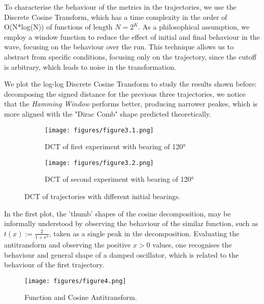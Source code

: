 \documentclass[11pt]{article}
\begin{document}
To characterise the behaviour of the metrics in the trajectories, we use the Discrete Cosine Transform, which has a time complexity in the order of O(N*log(N)) of functions of length $N = 2^K$. As a philosophical assumption, we employ a window function to reduce the effect of initial and final behaviour in the wave, focusing on the behaviour over the run. This technique allows us to abstract from specific conditions, focusing only on the trajectory, since the cutoff is arbitrary, which leads to noise in the transformation.

We plot the log-log Discrete Cosine Transform to study the results shown before: decomposing the signed distance for the previous three trajectories, we notice that the \textit{Hamming Window} performs better, producing narrower peakes, which is more aligned with the "Dirac Comb" shape predicted theoretically.

\begin{figure}[htbp]
  \centering
  \begin{subfigure}[b]{0.48\textwidth}
    \centering
    \texttt{[image: figures/figure3.1.png]}
    \caption{DCT of first experiment with bearing of 120°}
    \label{fig:dct1}
  \end{subfigure}
  \hfill
  \begin{subfigure}[b]{0.48\textwidth}
    \centering
    \texttt{[image: figures/figure3.2.png]}
    \caption{DCT of second experiment with bearing of 120°}
    \label{fig:dct2}
  \end{subfigure}
  \caption{DCT of trajectories with different initial bearings.}
  \label{fig:trajectories}
\end{figure}

In the first plot, the 'thumb' shapes of the cosine decomposition, may be informally understood by observing the behaviour of the similar function, such as $t(x) := \frac{2}{1+x^4}$, taken as a single peak in the decomposition. Evaluating the antitransform and observing the positive $x>0$ values, one recognises the behaviour and general shape of a damped oscillator, which is related to the behaviour of the first trajectory.

\begin{figure}[htbp]
  \centering
  \texttt{[image: figures/figure4.png]}
  \caption{Function and Cosine Antitransform.}
  \label{fig:antitransform}
\end{figure}
\end{document}
